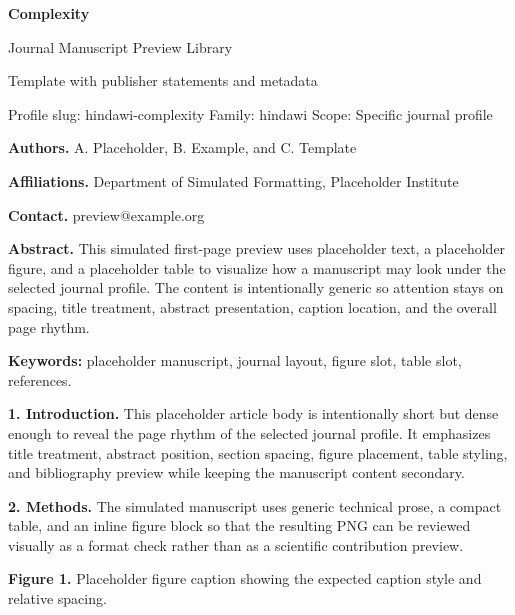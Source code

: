 \documentclass[10pt,a4paper]{article}
\begin{document}
\begin{center}
{\LARGE\bfseries Complexity}\par
\vspace{0.25em}
{\small Journal Manuscript Preview Library}\par
\vspace{0.15em}
{\footnotesize Template with publisher statements and metadata}\par
\vspace{0.2em}
{\footnotesize Profile slug: hindawi-complexity \quad Family: hindawi \quad Scope: Specific journal profile}
\end{center}
\vspace{0.2em}



\noindent\textbf{Authors.} A. Placeholder, B. Example, and C. Template\par
\noindent\textbf{Affiliations.} Department of Simulated Formatting, Placeholder Institute\par
\noindent\textbf{Contact.} preview@example.org\par
\vspace{0.4em}
\noindent\textbf{Abstract.} This simulated first-page preview uses placeholder text, a placeholder figure, and a placeholder table to visualize how a manuscript may look under the selected journal profile. The content is intentionally generic so attention stays on spacing, title treatment, abstract presentation, caption location, and the overall page rhythm.\par\vspace{0.6em}
\noindent\textbf{Keywords:} placeholder manuscript, journal layout, figure slot, table slot, references.\par\vspace{0.6em}


\small
\textbf{1. Introduction.} This placeholder article body is intentionally short but dense enough to reveal the page rhythm of the selected journal profile. It emphasizes title treatment, abstract position, section spacing, figure placement, table styling, and bibliography preview while keeping the manuscript content secondary.

\textbf{2. Methods.} The simulated manuscript uses generic technical prose, a compact table, and an inline figure block so that the resulting PNG can be reviewed visually as a format check rather than as a scientific contribution preview.


\begin{center}\end{center}\noindent\textbf{Figure 1.} Placeholder figure caption showing the expected caption style and relative spacing.\par\vspace{0.5em}
\end{document}
